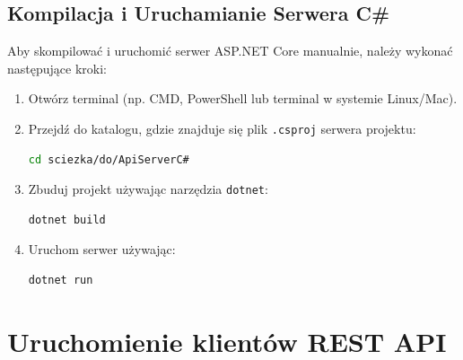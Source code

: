 \subsection{Kompilacja i Uruchamianie Serwera C\#}
\begin{spacing}{1.5} %

\end{spacing} %
    Aby skompilować i uruchomić serwer ASP.NET Core manualnie, należy wykonać następujące kroki:
    \begin{enumerate}
        \item Otwórz terminal (np. CMD, PowerShell lub terminal w systemie Linux/Mac).
        \item Przejdź do katalogu, gdzie znajduje się plik \texttt{.csproj} serwera projektu:
        \begin{lstlisting}[language=bash]
    cd sciezka/do/ApiServerC#
        \end{lstlisting}
        \item Zbuduj projekt używając narzędzia \texttt{dotnet}:
        \begin{lstlisting}[language=bash]
    dotnet build
        \end{lstlisting}
        \item Uruchom serwer używając:
        \begin{lstlisting}[language=bash]
    dotnet run
        \end{lstlisting}
    \end{enumerate}

\section{Uruchomienie klientów REST API}


